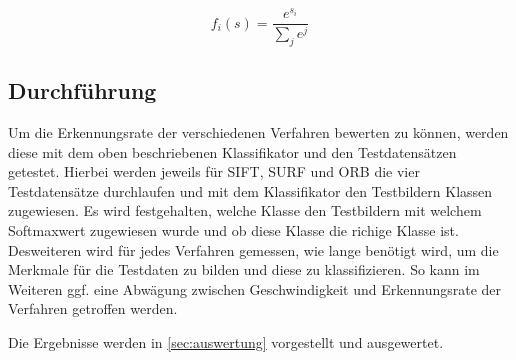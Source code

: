 \[
f_i(s) = \frac{e^{s_i}}{\sum_j e^j}
\]



\subsection{Durchführung}
\label{sub:durchführung}

Um die Erkennungsrate der verschiedenen Verfahren bewerten zu können, werden diese mit dem oben beschriebenen Klassifikator und den Testdatensätzen getestet.
Hierbei werden jeweils für SIFT, SURF und ORB die vier Testdatensätze durchlaufen und mit dem Klassifikator den Testbildern Klassen zugewiesen. 
Es wird festgehalten, welche Klasse den Testbildern mit welchem Softmaxwert zugewiesen wurde und ob diese Klasse die richige Klasse ist.
Desweiteren wird für jedes Verfahren gemessen, wie lange benötigt wird, um die Merkmale für die Testdaten zu bilden und diese zu klassifizieren. 
So kann im Weiteren ggf. eine Abwägung zwischen Geschwindigkeit und Erkennungsrate der Verfahren getroffen werden.

Die Ergebnisse werden in \ref{sec:auswertung} vorgestellt und ausgewertet.
